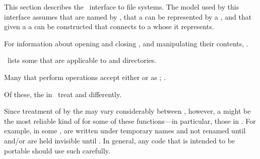 

This section describes the \clisp\ interface to file systems.
The model used by this interface assumes 
     that  are named by ,
     that a  can be represented by a  , 
 and that given a  a  can be constructed 
      that connects to a  whose  it represents.

For information about opening and closing ,
and manipulating their contents, \seechapter\Streams.

\Thenextfigure\ lists some  
that are applicable to  and directories.




\endsubsection%



Many  that perform  operations accept either
 or   as ;
\seesection\StreamArgsToStandardizedFns.

Of these, the  in \thenextfigure\ treat  and 
  differently.


Since treatment of   by the  
may vary considerably between , however, 
a   might be the most reliable kind of
 for some of these functions---in particular, those in
\thenextfigure.  For example, in some , 
  are written under temporary names 
and not renamed until 
and/or are held invisible until .
In general, any code that is intended to be portable should
use such  carefully.

